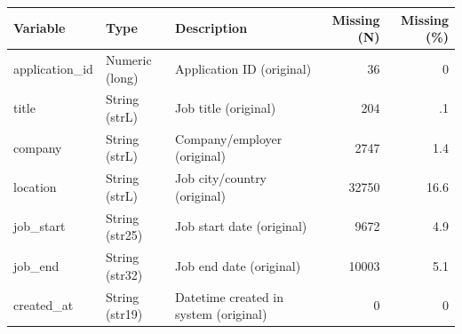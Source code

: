 \begin{threeparttable}


\begin{tabular}{@{}lllrr@{}}


\toprule


\textbf{Variable} & \textbf{Type} & \textbf{Description} & \textbf{Missing (N)} & \textbf{Missing (\%)} \\


\midrule


\midrule
application\_id & Numeric (long) & Application ID (original)&          36&           0\\
title & String (strL) & Job title (original)&         204&          .1\\
company & String (strL) & Company/employer (original)&        2747&         1.4\\
location & String (strL) & Job city/country (original)&       32750&        16.6\\
job\_start & String (str25) & Job start date (original)&        9672&         4.9\\
job\_end & String (str32) & Job end date (original)&       10003&         5.1\\
created\_at & String (str19) & Datetime created in system (original)&           0&           0\\
\bottomrule


\end{tabular}


\end{threeparttable}
